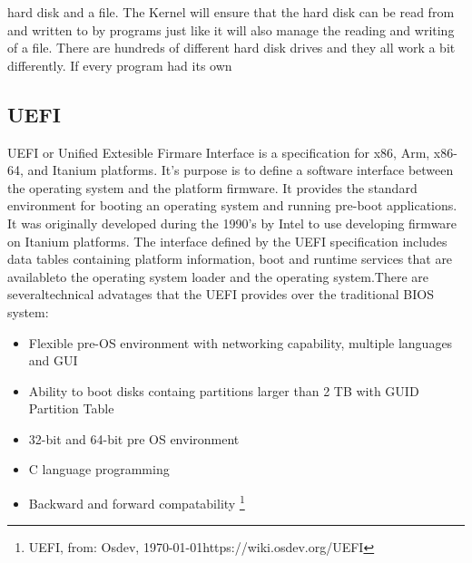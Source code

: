 hard disk and a
file. The Kernel will ensure that the hard disk can be read from and written
to by programs just like it will also manage the reading and writing of a
file. There are hundreds of different hard disk drives and they all work a
bit differently. If every program had its own 

\subsection{UEFI}

UEFI or Unified Extesible Firmare Interface is a specification for x86, Arm, x86-64, and Itanium platforms. It's purpose is to define a
software interface between the operating system and the platform firmware. It provides the standard environment for booting an 
operating system and running pre-boot applications. It was originally developed during the 1990's by Intel to use developing firmware
on Itanium platforms. The interface defined by the UEFI specification includes data tables containing platform information, boot and runtime services that are availableto the operating system loader and the operating system.There are  severaltechnical advatages that
the UEFI provides over the traditional BIOS system: 

\begin{itemize}

\item Flexible pre-OS environment with networking capability, multiple languages and GUI
\item Ability to boot disks containg partitions larger than 2 TB with GUID Partition Table
\item 32-bit and 64-bit pre OS environment
\item C language programming
\item Backward and forward compatability \footnote{UEFI, from: Osdev, \today https://wiki.osdev.org/UEFI}

\end{itemize}

